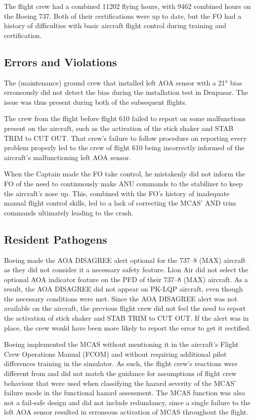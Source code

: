 \documentclass[
  10pt,
  promotesection,
  endnotes,
  draft,
]{memreport}
\begin{document}
  The flight crew had a combined 11202 flying hours, with 9462 combined hours on the Boeing 737. Both of their certifications were up to date, but the FO had a history of difficulties with basic aircraft flight control during training and certification.

  \subsection{Errors and Violations}
  The (maintenance) ground crew that installed left AOA sensor with a 21° bias  erroneously did not detect the bias during the installation test in Denpasar\autocite[\nopp{}xviii]{noauthor_aircraft_2019}. The issue was thus present during both of the subsequent flights.

  The crew from the flight before flight 610 failed to report on some malfunctions present on the aircraft, such as the activation of the stick shaker and STAB TRIM to CUT OUT\autocite[\nopp{}xviii]{noauthor_aircraft_2019}. That crew's failure to follow procedure on reporting every problem properly led to the crew of flight 610 being incorrectly informed of the aircraft's malfunctioning left AOA sensor.

  When the Captain made the FO take control, he mistakenly did not inform the FO of the need to continuously make ANU commands to the stabilizer to keep the aircraft's nose up. This, combined with the FO's history of inadequate manual flight control skills, led to a lack of correcting the MCAS' AND trim commands ultimately leading to the crash.

  \subsection{Resident Pathogens}
  Boeing made the AOA DISAGREE alert optional for the 737--8 (MAX) aircraft as they did not consider it a necessary safety feature. Lion Air did not select the optional AOA indicator feature on the PFD of their 737--8 (MAX) aircraft. As a result, the AOA DISAGREE did not appear on PK-LQP aircraft, even though the necessary conditions were met\autocite[\nopp{}45--46]{noauthor_aircraft_2019}. Since the AOA DISAGREE alert was not available on the aircraft, the previous flight crew did not feel the need to report the activation of stick shaker and STAB TRIM to CUT OUT\autocite[\nopp{}xviii]{noauthor_aircraft_2019}. If the alert was in place, the crew would have been more likely to report the error to get it rectified.

  Boeing implemented the MCAS without mentioning it in the aircraft's Flight Crew Operations Manual (FCOM) and without requiring additional pilot differences training in the simulator. As such, the flight crew's reactions were different from and did not match the guidance for assumptions of flight crew behaviour that were used when classifying the hazard severity of the MCAS' failure mode in the functional hazard assessment. The MCAS function was also not a fail-safe design and did not include redundancy, since a single failure to the left AOA sensor resulted in erroneous activation of MCAS throughout the flight\autocite[\nopp{}198--200]{noauthor_aircraft_2019}.
\end{document}
